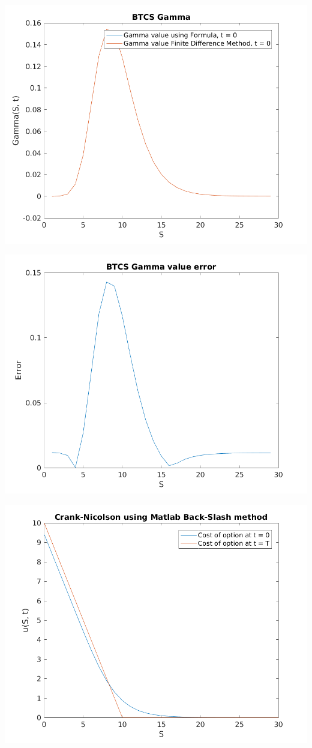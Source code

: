 \documentclass{article}
\begin{document}
\includegraphics{"q2_19"}
\pagebreak


\includegraphics{"q2_20"}
\pagebreak


\includegraphics{"q2_21"}
\pagebreak
\end{document}
